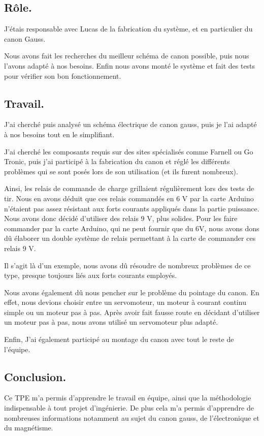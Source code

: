 \subsection{Rôle.}

J’étais responsable avec Lucas de la fabrication du système, et en particulier du canon Gauss.

Nous avons fait les recherches du meilleur schéma de canon possible, puis nous l’avons adapté à nos besoins. Enfin nous avons monté le système et fait des tests pour vérifier son bon fonctionnement.

\subsection{Travail.}

J’ai cherché puis analysé un schéma électrique de canon gauss, puis je l'ai adapté à nos besoins tout en le simplifiant.

J’ai cherché les composants requis sur des sites spécialisés comme Farnell ou Go Tronic, puis j’ai participé à la fabrication du canon et réglé les différents problèmes qui se sont posés lors de son utilisation (et ils furent nombreux).

Ainsi, les relais de commande de charge grillaient régulièrement lors des tests de tir. Nous en avons déduit que ces relais commandés en 6 V par la carte Arduino n’étaient pas assez résistant aux forts courants appliqués dans la partie puissance. Nous avons donc décidé d’utiliser des relais 9 V, plus solides. Pour les faire commander par la carte Arduino, qui ne peut fournir que du 6V, nous avons dons dû élaborer un double système de relais permettant à la carte de commander ces relais 9 V.

Il s’agit là d’un exemple, nous avons dû résoudre de nombreux problèmes de ce type, presque toujours liés aux forts courants employés.

Nous avons également dû nous pencher sur le problème du pointage du canon. En effet, nous devions choisir entre un servomoteur, un moteur à courant continu simple ou un moteur pas à pas. Après avoir fait fausse route en décidant d’utiliser un moteur pas à pas, nous avons utilisé un servomoteur plus adapté.

Enfin, J’ai également participé au montage du canon avec tout le reste de l’équipe.


\subsection{Conclusion.}

Ce TPE m’a permis d’apprendre le travail en équipe, ainsi que la méthodologie indispensable à tout projet d’ingénierie. De plus cela m’a permis d’apprendre de nombreuses informations notamment au sujet du canon gauss,  de l’électronique et du magnétisme.











